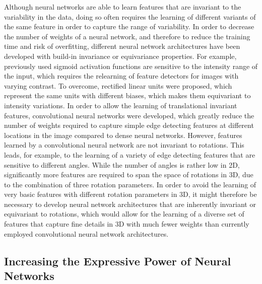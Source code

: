 Although neural networks are able to learn features that are invariant to the
variability in the data, doing so often requires the learning of different
variants of the same feature in order to capture the range of variability. In
order to decrease the number of weights of a neural network, and therefore to
reduce the training time and risk of overfitting, different neural network
architectures have been developed with build-in invariance or equivariance
properties. For example, previously used sigmoid activation functions are
sensitive to the intensity range of the input, which requires the relearning of
feature detectors for images with varying contrast. To overcome, rectified
linear units were proposed, which represent the same units with different
biases, which makes them equivariant to intensity variations. In order to allow
the learning of translational invariant features, convolutional neural networks
were developed, which greatly reduce the number of weights required to capture
simple edge detecting features at different locations in the image compared to
dense neural networks. However, features learned by a convolutional neural
network are not invariant to rotations. This leads, for example, to the learning
of a variety of edge detecting features that are sensitive to different angles.
While the number of angles is rather low in 2D, significantly more features are
required to span the space of rotations in 3D, due to the combination of three
rotation parameters. In order to avoid the learning of very basic features with
different rotation parameters in 3D, it might therefore be necessary to develop
neural network architectures that are inherently invariant or equivariant to
rotations, which would allow for the learning of a diverse set of features that
capture fine details in 3D with much fewer weights than currently employed
convolutional neural network architectures.

\subsection{Increasing the Expressive Power of Neural Networks}

